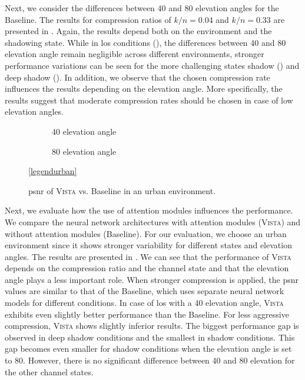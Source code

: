 \documentclass[conference]{IEEEtran}
\newcommand\ours{\textsc{Vista}\xspace}
\newcommand\baseline{Baseline\xspace}
\begin{document}
Next, we consider the differences between 40\textdegree{} and 80\textdegree{} elevation angles for the \baseline. 
The results for compression ratios of $k/n = 0.04$ and $k/n = 0.33$ are presented in .
Again, the results depend both on the environment and the shadowing state.
While in \ac{los} conditions (), the differences between 40\textdegree{} and 80\textdegree{} elevation angle remain negligible across different environments, 
stronger performance variations can be seen for the more challenging states shadow () and deep shadow ().
In addition, we observe that the chosen compression rate influences the results depending on the elevation angle.
More specifically, the results suggest that moderate compression rates should be chosen in case of low elevation angles.


\begin{figure}[t!]
  \begin{subfigure}{.48\linewidth}
  \centering
  
  \caption{40\textdegree{} elevation angle}
\end{subfigure}
\hfill
\begin{subfigure}{.48\linewidth}
  \centering
  
  \caption{80\textdegree{} elevation angle}
\end{subfigure}

\vspace{1em}
\centering
\ref{legendurban}

\caption{\ac{psnr} of \ours vs. \baseline in an urban environment.}
\label{fig:af_vs_no_af}
\end{figure}

Next, we evaluate how the use of attention modules influences the performance.
We compare the neural network architectures with attention modules (\ours) and without attention modules (\baseline).
For our evaluation, we choose an urban environment since it shows stronger variability for different states and elevation angles.
The results are presented in .
We can see that the performance of \ours depends on the compression ratio and the channel state and that the elevation angle plays a less important role. 
When stronger compression is applied, the \ac{psnr} values are similar to that of the \baseline, which uses separate neural network models for different conditions. 
In case of \ac{los} with a 40\textdegree{} elevation angle, \ours exhibits even slightly better performance than the \baseline.
For less aggressive compression, \ours shows slightly inferior results.
The biggest performance gap is observed in deep shadow conditions and the smallest in shadow conditions. 
This gap becomes even smaller for shadow conditions when the elevation angle is set to 80\textdegree{}. 
However, there is no significant difference between 40\textdegree{} and 80\textdegree{} elevation for the other channel states.
\end{document}
